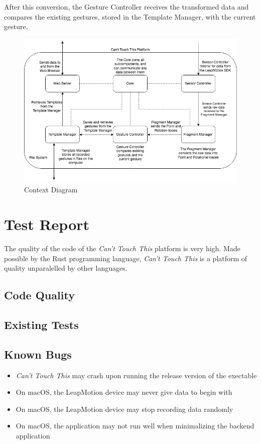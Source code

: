 \documentclass[a4paper]{article}
\providecommand{\tightlist}{%
\setlength{\itemsep}{0pt}\setlength{\parskip}{0pt}}
\begin{document}
  After this conversion, the Gesture Controller receives the transformed data
  and compares the existing gestures, stored in the Template Manager, with the
  current gesture.
  \clearpage

  \begin{figure}[h]
    \caption{Context Diagram}
    \centering
    \includegraphics[width=\linewidth]{functional-diagram}
  \end{figure}
  \clearpage


  \section{Test Report}
  The quality of the code of the \textit{Can't Touch This} platform is very
  high. Made possible by the Rust programming language, \textit{Can't Touch
    This} is a platform of quality unparalelled by other languages.

  \subsection{Code Quality}

  \subsection{Existing Tests}

  \subsection{Known Bugs}
  \begin{itemize}
    \tightlist
    \item \textit{Can't Touch This} may crash upon running the release version
      of the exectable
    \item On macOS, the LeapMotion device may never give data to begin with
    \item On macOS, the LeapMotion device may stop recording data randomly
    \item On macOS, the application may not run well when minimalizing the
      backend application
  \end{itemize}
\end{document}
